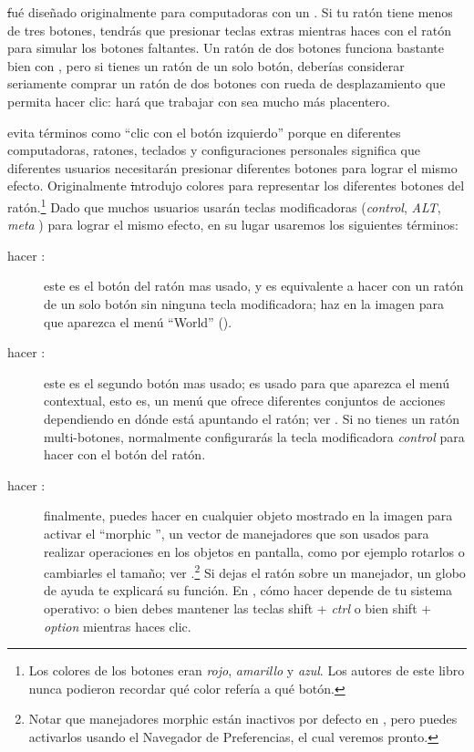 \documentclass[a4paper,10pt,twoside]{book}
\begin{document}
\st fu\'e dise\~nado originalmente para computadoras con un . Si tu rat\'on tiene menos de tres botones, tendr\'as que presionar teclas extras mientras haces \click con el rat\'on para simular los botones faltantes. Un rat\'on de dos botones funciona bastante bien con \pharo, pero si tienes un rat\'on de un solo bot\'on, deber\'ias considerar seriamente comprar un rat\'on de dos botones con rueda de desplazamiento que permita hacer clic: har\'a que trabajar con \pharo sea mucho m\'as placentero.

\pharo evita t\'erminos como ``clic con el bot\'on izquierdo'' porque en diferentes computadoras, ratones, teclados y configuraciones personales significa que diferentes usuarios necesitar\'an presionar diferentes botones para lograr el mismo efecto.
Originalmente \st introdujo colores para representar los diferentes botones del rat\'on.\footnote{Los colores de los botones eran \emph{rojo}, \emph{amarillo} y \emph{azul}. Los autores de este libro nunca podieron recordar qu\'e color refer\'ia a qu\'e bot\'on.}
Dado que muchos usuarios usar\'an teclas modificadoras (\emph{control}, \emph{ALT}, \emph{meta} \etc) para lograr el mismo efecto, en su lugar usaremos los siguientes t\'erminos:
\begin{description}
\item [hacer \click:] este es el bot\'on del rat\'on mas usado, y es equivalente a hacer \click con un rat\'on de un solo bot\'on sin ninguna tecla modificadora; haz \click en la imagen para que aparezca el men\'u ``World'' ().
\item [hacer \actclick:] este es el segundo bot\'on mas usado; es usado para que aparezca el men\'u contextual, esto es, un men\'u que ofrece diferentes conjuntos de acciones dependiendo en d\'onde est\'a apuntando el rat\'on; ver . Si no tienes un rat\'on multi-botones, normalmente configurar\'as la tecla modificadora \emph{control} para hacer \actclick con el bot\'on del rat\'on.
\item [hacer \metaclick:] finalmente, puedes hacer \metaclick en cualquier objeto mostrado en la imagen para activar el ``morphic '', un vector de manejadores que son usados para realizar operaciones en los objetos en pantalla, como por ejemplo rotarlos o cambiarles el tama\~no; ver .\footnote{Notar que manejadores morphic est\'an inactivos por defecto en \pharo, pero puedes activarlos usando el Navegador de Preferencias, el cual veremos pronto.}
Si dejas el rat\'on sobre un manejador, un globo de ayuda te explicar\'a su funci\'on.
En \pharo, c\'omo hacer \metaclick depende de tu sistema operativo:
o bien debes mantener las teclas {\sc shift} + \emph{ctrl} o bien {\sc shift} + \emph{option} mientras haces clic.
\end{description}
\end{document}
